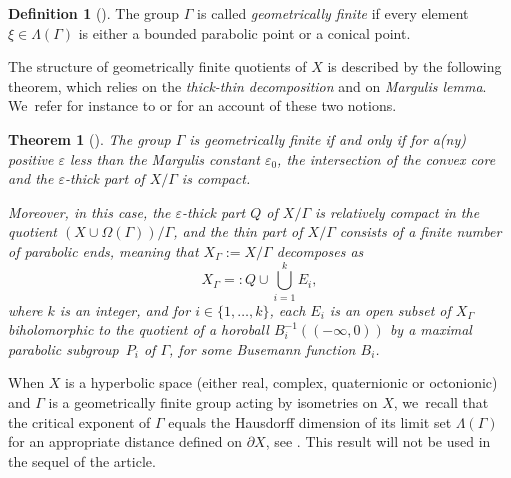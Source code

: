 \documentclass[JEP,XML,SOM,Unicode,NoEqCountersInSection,published]{cedram}
\let\epsilon\varepsilon
\newtheorem*{theorem*}{Theorem}
\theoremstyle{definition}
\newtheorem*{definition}{Definition}
\begin{document}
\begin{definition}[{\cite[Def.\,F2]{bowditchGeometricalFinitenessVariable1995}}]
The group $\Gamma$ is called \textit{geometrically finite} if every element $\xi\in\Lambda(\Gamma)$ is either a bounded parabolic point or a conical point.
\end{definition}

The structure of geometrically finite quotients of $X$ is described by the following theorem, which relies on the \textit{thick-thin decomposition} and on \textit{Margulis lemma}. We~refer for instance to \cite[Ch.\,D]{benedettiLecturesHyperbolicGeometry1992} or \cite[\S 3.5]{bowditchGeometricalFinitenessVariable1995} for an account of these two notions.

\begin{theorem*}[{\cite[Def.\,F1]{bowditchGeometricalFinitenessVariable1995}}]
The group $\Gamma$ is geometrically finite if and only if for a(ny) positive $\epsilon$ less than the Margulis constant $\epsilon_0$, the intersection of the convex core and the $\epsilon$-thick part of $X/\Gamma$ is compact.

Moreover, in this case, the $\epsilon$-thick part $Q$ of $X/\Gamma$ is relatively compact in the quotient $\left(X\cup \Omega(\Gamma)\right)/\Gamma$, and the thin part of $X/\Gamma$ consists of a finite number of parabolic ends, meaning that $X_{\Gamma}:=X/\Gamma$ decomposes as
\begin{equation}\label{eq-decompo-GF}
X_{\Gamma} =: Q \cup \bigcup_{i=1}^{k}E_i,
\end{equation}
where $k$ is an integer, and for $i\in \{1,\dots,k\}$, each $E_i$ is an open subset of $X_{\Gamma}$ biholomorphic to the quotient of a horoball $B_i^{-1}((-\infty,0))$ by a maximal parabolic subgroup~$P_i$ of $\Gamma$, for some Busemann function $B_i$.
\end{theorem*}
When $X$ is a hyperbolic space (either real, complex, quaternionic or octonionic) and $\Gamma$ is a geometrically finite group acting by isometries on $X$, we~recall that the critical exponent of $\Gamma$ equals the Hausdorff dimension of its limit set $\Lambda(\Gamma)$ for an appropriate distance defined on $\partial X$, see \cite[Th.\,6.1]{corletteLimitSetsDiscrete1999}. This result will not be used in the sequel of the article.
\end{document}
